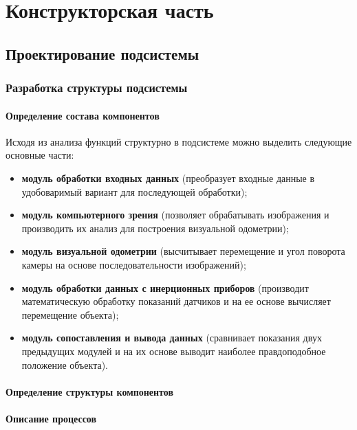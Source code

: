 \newpage

\section{Конструкторская часть}


\subsection{Проектирование подсистемы}
\subsubsection{Разработка структуры подсистемы}
\paragraph{Определение состава компонентов}

Исходя из анализа функций структурно в подсистеме можно выделить следующие основные части:
\begin{itemize}
\item \textbf{модуль обработки входных данных} (преобразует входные данные в удобоваримый вариант для последующей обработки);
\item \textbf{модуль компьютерного зрения }(позволяет обрабатывать изображения и производить их анализ для построения визуальной одометрии);
\item \textbf{модуль визуальной одометрии} (высчитывает перемещение и угол поворота камеры на основе последовательности изображений);
\item \textbf{модуль обработки данных с инерционных приборов} (производит математическую обработку показаний датчиков и на ее основе вычисляет перемещение объекта);
\item \textbf{модуль сопоставления  и вывода данных} (сравнивает показания двух предыдущих модулей и на их основе выводит наиболее правдоподобное положение объекта).
\end{itemize}

\paragraph{Определение структуры компонентов}

\paragraph{Описание процессов}

